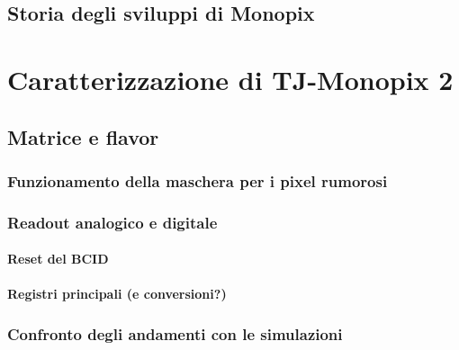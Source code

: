 \documentclass[10pt,a4paper,twoside]{report}
\begin{document}
\begin{comment}
small fill factor /large fill factor
\end{comment}

\section{Storia degli sviluppi di Monopix}




\chapter{Caratterizzazione di TJ-Monopix 2}

\section{Matrice e flavor}

\subsection{Funzionamento della maschera per i pixel rumorosi}

\subsection{Readout analogico e digitale}

\subsubsection{Reset del BCID}
\begin{comment}
REFERENZE
\end{comment}

\subsubsection{Registri principali (e conversioni?)}

\subsection{Confronto degli andamenti con le simulazioni}
\end{document}
